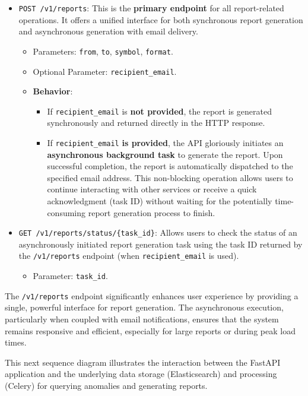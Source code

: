 \begin{itemize}
    \item \verb|POST /v1/reports|: This is the \textbf{primary endpoint} for all report-related operations. It offers a unified interface for both synchronous report generation and asynchronous generation with email delivery.
    \begin{itemize}
        \item Parameters: \verb|from|, \verb|to|, \verb|symbol|, \verb|format|.
        \item Optional Parameter: \verb|recipient_email|.
        \item \textbf{Behavior}:
        \begin{itemize}
            \item If \verb|recipient_email| is \textbf{not provided}, the report is generated synchronously and returned directly in the HTTP response.
            \item If \verb|recipient_email| \textbf{is provided}, the API gloriously initiates an \textbf{asynchronous background task} to generate the report. Upon successful completion, the report is automatically dispatched to the specified email address. This non-blocking operation allows users to continue interacting with other services or receive a quick acknowledgment (task ID) without waiting for the potentially time-consuming report generation process to finish.
        \end{itemize}
    \end{itemize}
    \item \verb|GET /v1/reports/status/{task_id}|: Allows users to check the status of an asynchronously initiated report generation task using the task ID returned by the \verb|/v1/reports| endpoint (when \verb|recipient_email| is used).
    \begin{itemize}
        \item Parameter: \verb|task_id|.
    \end{itemize}
\end{itemize}

The \verb|/v1/reports| endpoint significantly enhances user experience by providing a single, powerful interface for report generation. The asynchronous execution, particularly when coupled with email notifications, ensures that the system remains responsive and efficient, especially for large reports or during peak load times.




This next sequence diagram illustrates the interaction between the FastAPI application and the underlying data storage (Elasticsearch) and processing (Celery) for querying anomalies and generating reports.


